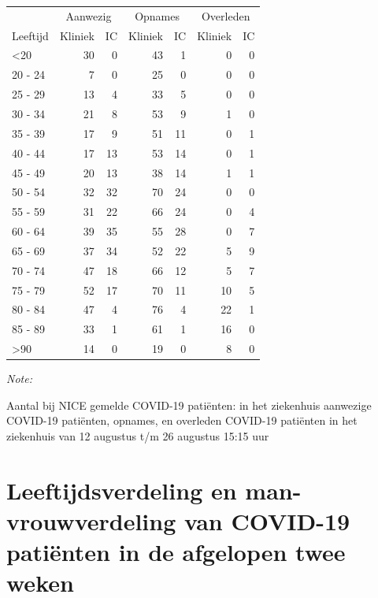 \documentclass[
  english,
  man,floatsintext]{apa6}
\begin{document}
\begin{table}
\centering\begingroup\fontsize{10}{12}\selectfont

\begin{threeparttable}
\begin{tabular}{lrrrrrr}
\toprule
\multicolumn{1}{c}{ } & \multicolumn{2}{c}{Aanwezig} & \multicolumn{2}{c}{Opnames} & \multicolumn{2}{c}{Overleden} \\
\cmidrule(l{3pt}r{3pt}){2-3} \cmidrule(l{3pt}r{3pt}){4-5} \cmidrule(l{3pt}r{3pt}){6-7}
Leeftijd & Kliniek & IC & Kliniek & IC & Kliniek & IC\\
\midrule
<20 & 30 & 0 & 43 & 1 & 0 & 0\\
20 - 24 & 7 & 0 & 25 & 0 & 0 & 0\\
25 - 29 & 13 & 4 & 33 & 5 & 0 & 0\\
30 - 34 & 21 & 8 & 53 & 9 & 1 & 0\\
35 - 39 & 17 & 9 & 51 & 11 & 0 & 1\\
40 - 44 & 17 & 13 & 53 & 14 & 0 & 1\\
45 - 49 & 20 & 13 & 38 & 14 & 1 & 1\\
50 - 54 & 32 & 32 & 70 & 24 & 0 & 0\\
55 - 59 & 31 & 22 & 66 & 24 & 0 & 4\\
60 - 64 & 39 & 35 & 55 & 28 & 0 & 7\\
65 - 69 & 37 & 34 & 52 & 22 & 5 & 9\\
70 - 74 & 47 & 18 & 66 & 12 & 5 & 7\\
75 - 79 & 52 & 17 & 70 & 11 & 10 & 5\\
80 - 84 & 47 & 4 & 76 & 4 & 22 & 1\\
85 - 89 & 33 & 1 & 61 & 1 & 16 & 0\\
>90 & 14 & 0 & 19 & 0 & 8 & 0\\
\bottomrule
\end{tabular}
\begin{tablenotes}
\item \textit{Note: } 
\item Aantal bij NICE gemelde COVID-19 patiënten: in het ziekenhuis aanwezige COVID-19 patiënten, opnames, en overleden COVID-19 patiënten in het ziekenhuis van 12 augustus t/m 26 augustus 15:15 uur
\end{tablenotes}
\end{threeparttable}
\endgroup{}
\end{table}

\newpage

\hypertarget{leeftijdsverdeling-en-man-vrouwverdeling-van-covid-19-patiuxebnten-in-de-afgelopen-twee-weken}{%
\section{Leeftijdsverdeling en man-vrouwverdeling van COVID-19 patiënten in de afgelopen twee weken}\label{leeftijdsverdeling-en-man-vrouwverdeling-van-covid-19-patiuxebnten-in-de-afgelopen-twee-weken}}
\end{document}
